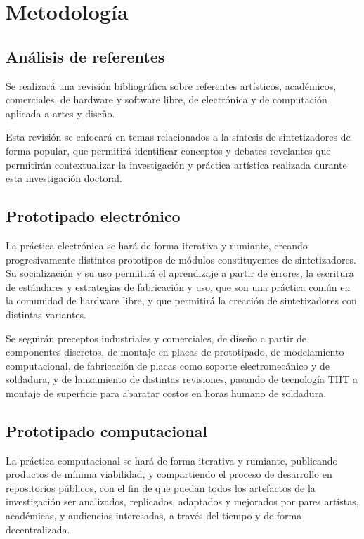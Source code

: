 \documentclass[../proyecto.tex]{subfiles}
\begin{document}
\section{Metodología}


\subsection{Análisis de referentes}

Se realizará una revisión bibliográfica sobre referentes artísticos, académicos, comerciales, de hardware y software libre, de electrónica y de computación aplicada a artes y diseño.

Esta revisión se enfocará en temas relacionados a la síntesis de sintetizadores de forma popular, que permitirá identificar conceptos y debates revelantes que permitirán contextualizar la investigación y práctica artística realizada durante esta investigación doctoral.

\subsection{Prototipado electrónico}

La práctica electrónica se hará de forma iterativa y rumiante, creando progresivamente distintos prototipos de módulos constituyentes de sintetizadores. Su socialización y su uso permitirá el aprendizaje a partir de errores, la escritura de estándares y estrategias de fabricación y uso, que son una práctica común en la comunidad de hardware libre, y que permitirá la creación de sintetizadores con distintas variantes.

Se seguirán preceptos industriales y comerciales, de diseño a partir de componentes discretos, de montaje en placas de prototipado, de modelamiento computacional, de fabricación de placas como soporte electromecánico y de soldadura, y de lanzamiento de distintas revisiones, pasando de tecnología THT a montaje de superficie para abaratar costos en horas humano de soldadura.

\subsection{Prototipado computacional}

La práctica computacional se hará de forma iterativa y rumiante, publicando productos de mínima viabilidad, y compartiendo el proceso de desarrollo en repositorios públicos, con el fin de que puedan todos los artefactos de la investigación ser analizados, replicados, adaptados y mejorados por pares artistas, académicas, y audiencias interesadas, a través del tiempo y de forma decentralizada.
\end{document}
